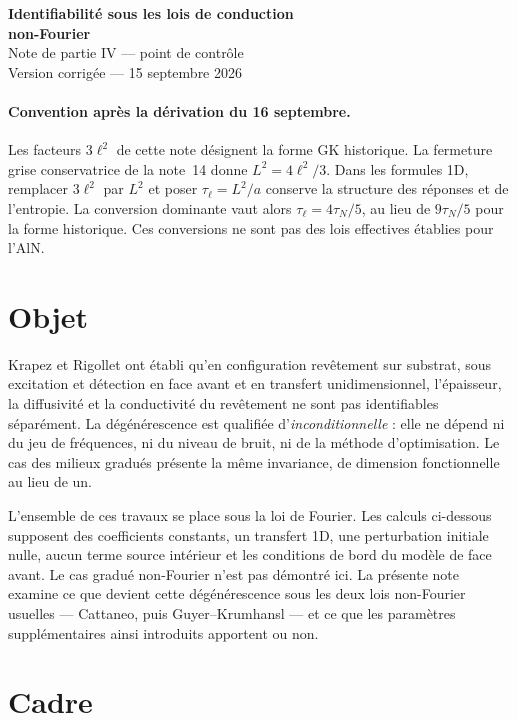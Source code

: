 \documentclass[11pt,a4paper]{article}
\begin{document}
\begin{center}
{\Large\bfseries Identifiabilité sous les lois de conduction\\non-Fourier}\\[5pt]
{\normalsize Note de partie IV --- point de contrôle}\\[2pt]
{\small Version corrigée --- 15 septembre 2026}
\end{center}

\vspace{4pt}

\paragraph{Convention après la dérivation du 16 septembre.}
Les facteurs $3\ell^2$ de cette note désignent la forme GK historique.
La fermeture grise conservatrice de la note~14 donne $L^2=4\ell^2/3$.
Dans les formules 1D, remplacer $3\ell^2$ par $L^2$ et poser
$\tau_\ell=L^2/a$ conserve la structure des réponses et de l'entropie.
La conversion dominante vaut alors $\tau_\ell=4\tau_N/5$, au lieu de
$9\tau_N/5$ pour la forme historique. Ces conversions ne sont pas des
lois effectives établies pour l'AlN.

\section{Objet}

Krapez et Rigollet ont établi qu'en configuration revêtement sur substrat, sous excitation et
détection en face avant et en transfert unidimensionnel, l'épaisseur, la diffusivité et la
conductivité du revêtement ne sont pas identifiables séparément. La dégénérescence est qualifiée
d'\emph{inconditionnelle} : elle ne dépend ni du jeu de fréquences, ni du niveau de bruit, ni de la
méthode d'optimisation. Le cas des milieux gradués présente la même invariance, de dimension
fonctionnelle au lieu de un.

L'ensemble de ces travaux se place sous la loi de Fourier. Les calculs ci-dessous supposent des coefficients constants, un transfert 1D, une perturbation initiale nulle, aucun terme source intérieur et les conditions de bord du modèle de face avant. Le cas gradué non-Fourier n'est pas démontré ici. La présente note examine ce que devient
cette dégénérescence sous les deux lois non-Fourier usuelles --- Cattaneo, puis Guyer--Krumhansl ---
et ce que les paramètres supplémentaires ainsi introduits apportent ou non.

\section{Cadre}
\end{document}
